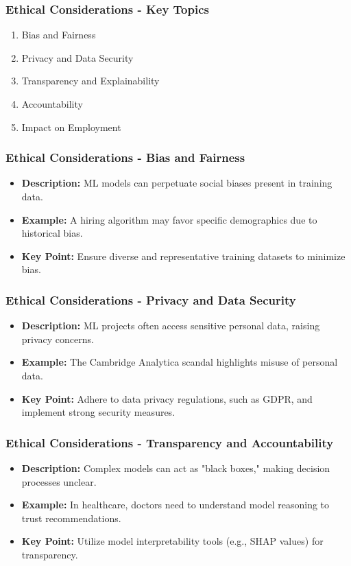 \documentclass[aspectratio=169]{beamer}
\begin{document}
\begin{frame}[fragile]
    \frametitle{Ethical Considerations - Key Topics}
    \begin{enumerate}
        \item Bias and Fairness
        \item Privacy and Data Security
        \item Transparency and Explainability
        \item Accountability
        \item Impact on Employment
    \end{enumerate}
\end{frame}

\begin{frame}[fragile]
    \frametitle{Ethical Considerations - Bias and Fairness}
    \begin{itemize}
        \item \textbf{Description:} ML models can perpetuate social biases present in training data.
        \item \textbf{Example:} A hiring algorithm may favor specific demographics due to historical bias.
        \item \textbf{Key Point:} Ensure diverse and representative training datasets to minimize bias.
    \end{itemize}
\end{frame}

\begin{frame}[fragile]
    \frametitle{Ethical Considerations - Privacy and Data Security}
    \begin{itemize}
        \item \textbf{Description:} ML projects often access sensitive personal data, raising privacy concerns.
        \item \textbf{Example:} The Cambridge Analytica scandal highlights misuse of personal data.
        \item \textbf{Key Point:} Adhere to data privacy regulations, such as GDPR, and implement strong security measures.
    \end{itemize}
\end{frame}

\begin{frame}[fragile]
    \frametitle{Ethical Considerations - Transparency and Accountability}
    \begin{itemize}
        \item \textbf{Description:} Complex models can act as "black boxes," making decision processes unclear.
        \item \textbf{Example:} In healthcare, doctors need to understand model reasoning to trust recommendations.
        \item \textbf{Key Point:} Utilize model interpretability tools (e.g., SHAP values) for transparency.
    \end{itemize}
\end{frame}
\end{document}
